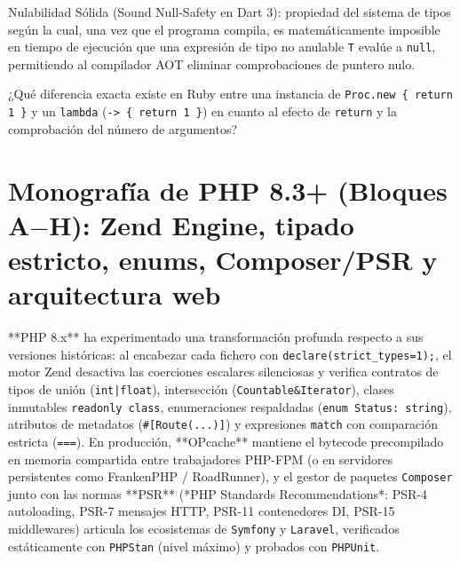\documentclass{book}
\begin{document}
\begin{tcolorbox}[title={Definición}, studiumdef, breakable]

Nulabilidad Sólida (Sound Null-Safety en Dart 3): propiedad del sistema de tipos según la cual, una vez que el programa compila, es matemáticamente imposible en tiempo de ejecución que una expresión de tipo no anulable \texttt{T} evalúe a \texttt{null}, permitiendo al compilador AOT eliminar comprobaciones de puntero nulo.
\end{tcolorbox}

\begin{tcolorbox}[title={Autoficha}, studiumcheck, breakable]

¿Qué diferencia exacta existe en Ruby entre una instancia de \texttt{Proc.new \{ return 1 \}} y un \texttt{lambda} (\texttt{-> \{ return 1 \}}) en cuanto al efecto de \texttt{return} y la comprobación del número de argumentos?
\end{tcolorbox}

\section{Monografía de PHP 8.3+ (Bloques A\(-\)H): Zend Engine, tipado estricto, enums, Composer/PSR y arquitectura web}

**PHP 8.x** ha experimentado una transformación profunda respecto a sus versiones históricas: al encabezar cada fichero con \texttt{declare(strict\_types=1);}, el motor Zend desactiva las coerciones escalares silenciosas y verifica contratos de tipos de unión (\texttt{int|float}), intersección (\texttt{Countable\&Iterator}), clases inmutables \texttt{readonly class}, enumeraciones respaldadas (\texttt{enum Status: string}), atributos de metadatos (\texttt{\#[Route(...)]}) y expresiones \texttt{match} con comparación estricta (\texttt{===}). En producción, **OPcache** mantiene el bytecode precompilado en memoria compartida entre trabajadores PHP-FPM (o en servidores persistentes como FrankenPHP / RoadRunner), y el gestor de paquetes \texttt{Composer} junto con las normas **PSR** (*PHP Standards Recommendations*: PSR-4 autoloading, PSR-7 mensajes HTTP, PSR-11 contenedores DI, PSR-15 middlewares) articula los ecosistemas de \texttt{Symfony} y \texttt{Laravel}, verificados estáticamente con \texttt{PHPStan} (nivel máximo) y probados con \texttt{PHPUnit}.
\end{document}

